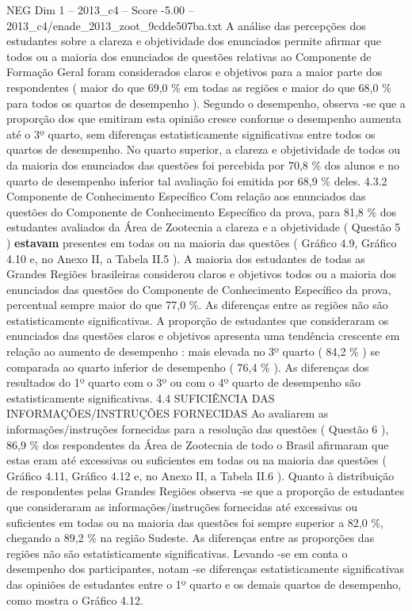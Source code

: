 \begin{textsample}{NEG Dim 1 – 2013\_c4 – Score -5.00 – 2013\_c4/enade\_2013\_zoot\_9cdde507ba.txt}
A análise das percepções dos estudantes sobre a clareza e objetividade dos enunciados permite afirmar que todos ou a maioria dos enunciados de questões relativas ao Componente de Formação Geral foram considerados claros e objetivos para a maior parte dos respondentes ( maior do que 69,0 \% em todas as regiões e maior do que 68,0 \% para todos os quartos de desempenho ).
Segundo o desempenho, observa -se que a proporção dos que emitiram esta opinião cresce conforme o desempenho aumenta até o 3º quarto, sem diferenças estatisticamente significativas entre todos os quartos de desempenho.
No quarto superior, a clareza e objetividade de todos ou da maioria dos enunciados das questões foi percebida por 70,8 \% dos alunos e no quarto de desempenho inferior tal avaliação foi emitida por 68,9 \% deles. 4.3.2 Componente de Conhecimento Específico Com relação aos enunciados das questões do Componente de Conhecimento Específico da prova, para 81,8 \% dos estudantes avaliados da Área de Zootecnia a clareza e a objetividade ( Questão 5 ) \textbf{estavam} presentes em todas ou na maioria das questões ( Gráfico 4.9, Gráfico 4.10 e, no Anexo II, a Tabela II.5 ).
A maioria dos estudantes de todas as Grandes Regiões brasileiras considerou claros e objetivos todos ou a maioria dos enunciados das questões do Componente de Conhecimento Específico da prova, percentual sempre maior do que 77,0 \%.
As diferenças entre as regiões não são estatisticamente significativas.
A proporção de estudantes que consideraram os enunciados das questões claros e objetivos apresenta uma tendência crescente em relação ao aumento de desempenho : mais elevada no 3º quarto ( 84,2 \% ) se comparada ao quarto inferior de desempenho ( 76,4 \% ).
As diferenças dos resultados do 1º quarto com o 3º ou com o 4º quarto de desempenho são estatisticamente significativas. 4.4 SUFICIÊNCIA DAS INFORMAÇÕES/INSTRUÇÕES FORNECIDAS Ao avaliarem as informações/instruções fornecidas para a resolução das questões ( Questão 6 ), 86,9 \% dos respondentes da Área de Zootecnia de todo o Brasil afirmaram que estas eram até excessivas ou suficientes em todas ou na maioria das questões ( Gráfico 4.11, Gráfico 4.12 e, no Anexo II, a Tabela II.6 ).
Quanto à distribuição de respondentes pelas Grandes Regiões observa -se que a proporção de estudantes que consideraram as informações/instruções fornecidas até excessivas ou suficientes em todas ou na maioria das questões foi sempre superior a 82,0 \%, chegando a 89,2 \% na região Sudeste.
As diferenças entre as proporções das regiões não são estatisticamente significativas.
Levando -se em conta o desempenho dos participantes, notam -se diferenças estatisticamente significativas das opiniões de estudantes entre o 1º quarto e os demais quartos de desempenho, como mostra o Gráfico 4.12.

\end{textsample}
